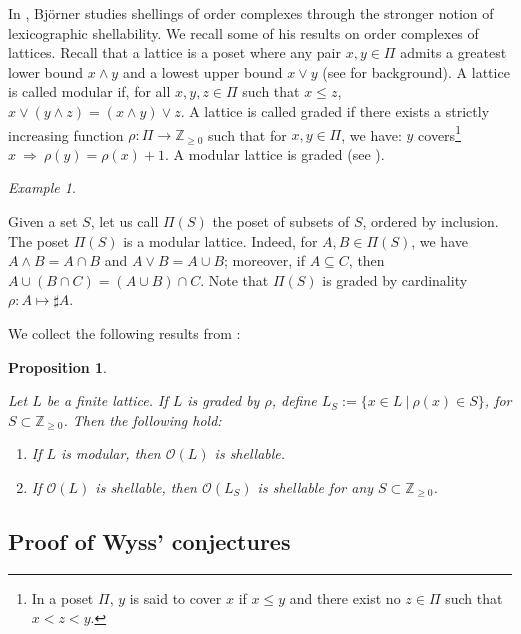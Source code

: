\documentclass[11pt,english]{article}
\numberwithin{equation}{section}
\numberwithin{figure}{section}
\theoremstyle{definition}
\theoremstyle{plain}
\newtheorem{prop}[df]{Proposition}
\theoremstyle{remark}
\newtheorem{exmp}[df]{Example}
\newcommand\ZZ{\mathbb{Z}}
\begin{document}
In \cite{Bjo80}, Björner studies shellings of order complexes through
the stronger notion of lexicographic shellability. We recall some
of his results on order complexes of lattices. Recall that a lattice
is a poset where any pair $x,y\in\Pi$ admits a greatest lower bound
$x\wedge y$ and a lowest upper bound $x\vee y$ (see \cite[Ch. I.]{Bir73}
for background). A lattice is called modular if, for all $x,y,z\in\Pi$
such that $x\leq z$, $x\vee(y\wedge z)=(x\wedge y)\vee z$. A lattice
is called graded if there exists a strictly increasing function $\rho:\Pi\rightarrow\ZZ_{\geq0}$
such that for $x,y\in\Pi$, we have: $y$ covers\footnote{In a poset $\Pi$, $y$ is said to cover $x$ if $x\leq y$ and there
exist no $z\in\Pi$ such that $x<z<y$.} $x\ \Rightarrow\ \rho(y)=\rho(x)+1$. A modular lattice is graded
(see \cite[Ch II, \S 8]{Bir73}).

\begin{exmp} \label{Exmp/OrderCpx}

Given a set $S$, let us call $\Pi(S)$ the poset of subsets of $S$,
ordered by inclusion. The poset $\Pi(S)$ is a modular lattice. Indeed,
for $A,B\in\Pi(S)$, we have $A\wedge B=A\cap B$ and $A\vee B=A\cup B$;
moreover, if $A\subseteq C$, then $A\cup(B\cap C)=(A\cup B)\cap C$.
Note that $\Pi(S)$ is graded by cardinality $\rho:A\mapsto\sharp A$.

\end{exmp}

We collect the following results from \cite{Bjo80}:

\begin{prop} \label{Prop/LattShell}

Let $L$ be a finite lattice. If $L$ is graded by $\rho$, define
$L_{S}:=\{x\in L\ \vert\ \rho(x)\in S\}$, for $S\subset\ZZ_{\geq0}$.
Then the following hold:
\begin{enumerate}
\item \cite[Thm. 3.1.]{Bjo80} If $L$ is modular, then $\mathcal{O}(L)$
is shellable.
\item \cite[Thm. 4.1.]{Bjo80} If $\mathcal{O}(L)$ is shellable, then $\mathcal{O}(L_{S})$
is shellable for any $S\subset\ZZ_{\geq0}$.
\end{enumerate}
\end{prop}

\subsection{Proof of Wyss' conjectures \label{Subsect/WyssConj}}
\end{document}
